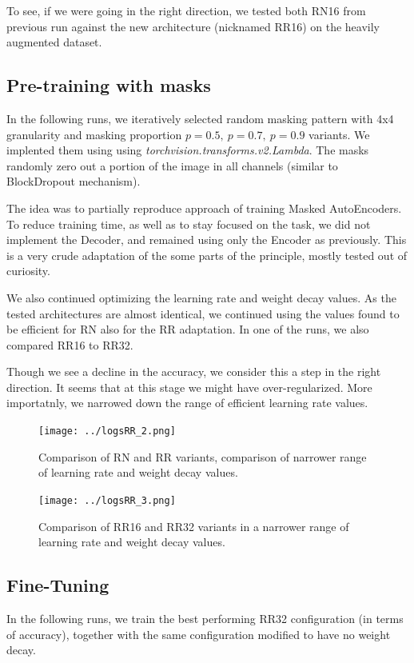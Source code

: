 \documentclass[12pt,a4paper]{article}
\begin{document}
To see, if we were going in the right direction, we tested both RN16 from
previous run against the new architecture (nicknamed RR16) on the
heavily augmented dataset.

\subsection{Pre-training with masks}

In the following runs, we iteratively selected random masking
pattern
with 4x4 granularity and masking proportion $p=0.5, \ p=0.7, \ p=0.9$ variants.
We implented them using using 
\emph{torchvision.transforms.v2.Lambda}. The masks randomly
zero out a portion of the image in all channels (similar to BlockDropout mechanism).

The idea was to partially reproduce approach of training Masked AutoEncoders.
To reduce training time, as well as to stay focused on the
task, we did not implement the Decoder, and remained using
only the Encoder as previously. This is a very crude adaptation of
the some parts of the principle, mostly tested out of curiosity.

We also continued optimizing the learning rate and weight decay
values. As the tested architectures are almost identical, we
continued using the values found to be efficient for RN also
for the RR adaptation. In one of the runs, we also compared
RR16 to RR32.

Though we see a decline in the accuracy, we consider this
a step in the right direction. It seems that at this stage
we might have over-regularized. More importatnly, we narrowed
down the range of efficient learning rate values.

\begin{figure}[H]
  \texttt{[image: ../logsRR\_2.png]}
  \caption{Comparison of RN and RR variants, comparison of narrower
  range of learning rate and weight decay values.}
\end{figure}

\begin{figure}[H]
  \texttt{[image: ../logsRR\_3.png]}
  \caption{Comparison of RR16 and RR32 variants in a narrower range
  of learning rate and weight decay values.}
\end{figure}

\subsection{Fine-Tuning}

In the following runs, we train the best performing RR32
configuration (in terms of accuracy), together with the same
configuration modified to have no weight decay.
\end{document}
